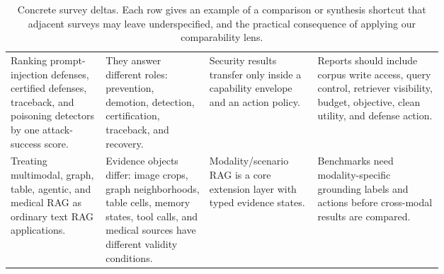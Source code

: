 \begin{table}[t]
\begin{tabularx}{\linewidth}{>{\raggedright\arraybackslash}p{0.22\linewidth}>{\raggedright\arraybackslash}p{0.24\linewidth}>{\raggedright\arraybackslash}p{0.25\linewidth}X}
Ranking prompt-injection defenses, certified defenses, traceback, and poisoning detectors by one attack-success score. & They answer different roles: prevention, demotion, detection, certification, traceback, and recovery. & Security results transfer only inside a capability envelope and an action policy. & Reports should include corpus write access, query control, retriever visibility, budget, objective, clean utility, and defense action. \\
Treating multimodal, graph, table, agentic, and medical RAG as ordinary text RAG applications. & Evidence objects differ: image crops, graph neighborhoods, table cells, memory states, tool calls, and medical sources have different validity conditions. & Modality/scenario RAG is a core extension layer with typed evidence states. & Benchmarks need modality-specific grounding labels and actions before cross-modal results are compared. \\
\bottomrule
\end{tabularx}
\caption{Concrete survey deltas. Each row gives an example of a comparison or synthesis shortcut that adjacent surveys may leave underspecified, and the practical consequence of applying our comparability lens.}
\label{tab:prior-survey-concrete-delta}
\end{table}
\fi
